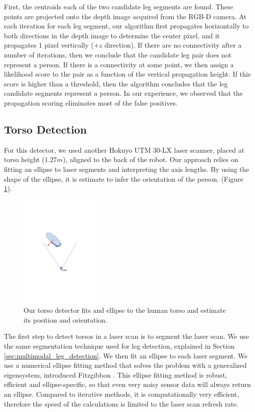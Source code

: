 First, the centroids each of the two candidate leg segments are found.  These points are projected onto the depth image acquired from the RGB-D camera. At each iteration for each leg segment, our algorithm first propagates horizontally to both directions in the depth image to determine the center pixel, and it propagates 1 pixel vertically ($+z$ direction). If there are no connectivity after a number of iterations, then we conclude that the candidate leg pair does not represent a person. If there is a connectivity at some point, we then assign a likelihood score to the pair as a function of the vertical propagation height. If this score is higher than a threshold, then the algorithm concludes that the leg candidate segments represent a person. In our experience, we observed that the propagation scoring eliminates most of the false positives.

\subsection{Torso Detection}
\label{sec:multimodal_torso_detection}

For this detector, we used another Hokuyo UTM 30-LX laser scanner, placed at torso height ($1.27m$), aligned to the back of the robot. Our approach relies on fitting an ellipse to laser segments and interpreting the axis lengths. By using the shape of the ellipse, it is estimate to infer the orientation of the person. (Figure \ref{fig:ellipse}).

\begin{figure}[ht!]
\centering
\includegraphics[width=0.35\textwidth]{pics/ellipse}
\caption{Our torso detector fits and ellipse to the human torso and estimate its position and orientation.}
\label{fig:ellipse}
\end{figure}

The first step to detect torsos in a laser scan is to segment the laser scan. We use the same segmentation technique used for leg detection, explained in Section \ref{sec:multimodal_leg_detection}. We then fit an ellipse to each laser segment. We use a numerical ellipse fitting method that solves the problem with a generalized eigensystem, introduced Fitzgibbon \cite{fitzgibbon1999direct}. This ellipse fitting method is robust, efficient and ellipse-specific, so that even very noisy sensor data will always return an ellipse. Compared to iterative methods, it is computationally very efficient, therefore the speed of the calculations is limited to the laser scan refresh rate.

